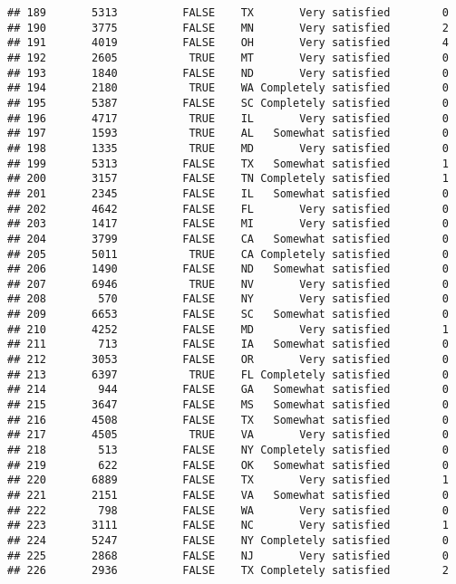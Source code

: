 \documentclass[]{book}
\theoremstyle{definition}
\theoremstyle{definition}
\theoremstyle{remark}
\begin{document}
\begin{verbatim}
## 189       5313          FALSE    TX       Very satisfied        0
## 190       3775          FALSE    MN       Very satisfied        2
## 191       4019          FALSE    OH       Very satisfied        4
## 192       2605           TRUE    MT       Very satisfied        0
## 193       1840          FALSE    ND       Very satisfied        0
## 194       2180           TRUE    WA Completely satisfied        0
## 195       5387          FALSE    SC Completely satisfied        0
## 196       4717           TRUE    IL       Very satisfied        0
## 197       1593           TRUE    AL   Somewhat satisfied        0
## 198       1335           TRUE    MD       Very satisfied        0
## 199       5313          FALSE    TX   Somewhat satisfied        1
## 200       3157          FALSE    TN Completely satisfied        1
## 201       2345          FALSE    IL   Somewhat satisfied        0
## 202       4642          FALSE    FL       Very satisfied        0
## 203       1417          FALSE    MI       Very satisfied        0
## 204       3799          FALSE    CA   Somewhat satisfied        0
## 205       5011           TRUE    CA Completely satisfied        0
## 206       1490          FALSE    ND   Somewhat satisfied        0
## 207       6946           TRUE    NV       Very satisfied        0
## 208        570          FALSE    NY       Very satisfied        0
## 209       6653          FALSE    SC   Somewhat satisfied        0
## 210       4252          FALSE    MD       Very satisfied        1
## 211        713          FALSE    IA   Somewhat satisfied        0
## 212       3053          FALSE    OR       Very satisfied        0
## 213       6397           TRUE    FL Completely satisfied        0
## 214        944          FALSE    GA   Somewhat satisfied        0
## 215       3647          FALSE    MS   Somewhat satisfied        0
## 216       4508          FALSE    TX   Somewhat satisfied        0
## 217       4505           TRUE    VA       Very satisfied        0
## 218        513          FALSE    NY Completely satisfied        0
## 219        622          FALSE    OK   Somewhat satisfied        0
## 220       6889          FALSE    TX       Very satisfied        1
## 221       2151          FALSE    VA   Somewhat satisfied        0
## 222        798          FALSE    WA       Very satisfied        0
## 223       3111          FALSE    NC       Very satisfied        1
## 224       5247          FALSE    NY Completely satisfied        0
## 225       2868          FALSE    NJ       Very satisfied        0
## 226       2936          FALSE    TX Completely satisfied        2

\end{verbatim}
\end{document}

